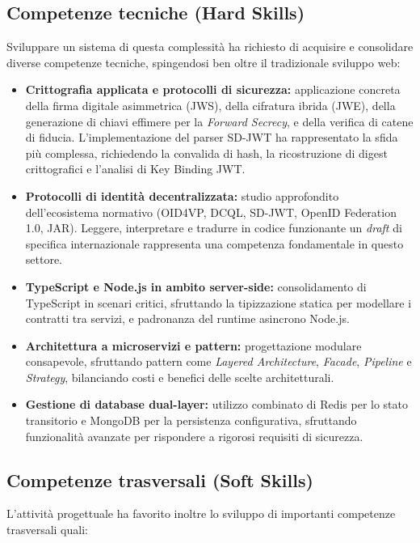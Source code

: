 \subsection{Competenze tecniche (Hard Skills)}
Sviluppare un sistema di questa complessità ha richiesto di acquisire e consolidare diverse competenze tecniche, spingendosi ben oltre il tradizionale sviluppo web:

\begin{itemize}
    \item \textbf{Crittografia applicata e protocolli di sicurezza:} applicazione concreta della firma digitale asimmetrica (JWS), della cifratura ibrida (JWE), della generazione di chiavi effimere per la \textit{Forward Secrecy}, e della verifica di catene di fiducia. L'implementazione del parser SD-JWT ha rappresentato la sfida più complessa, richiedendo la convalida di hash, la ricostruzione di digest crittografici e l'analisi di Key Binding JWT.
    \item \textbf{Protocolli di identità decentralizzata:} studio approfondito dell'ecosistema normativo (OID4VP, DCQL, SD-JWT, OpenID Federation 1.0, JAR). Leggere, interpretare e tradurre in codice funzionante un \textit{draft} di specifica internazionale rappresenta una competenza fondamentale in questo settore.
    \item \textbf{TypeScript e Node.js in ambito server-side:} consolidamento di TypeScript in scenari critici, sfruttando la tipizzazione statica per modellare i contratti tra servizi, e padronanza del runtime asincrono Node.js.
    \item \textbf{Architettura a microservizi e pattern:} progettazione modulare consapevole, sfruttando pattern come \textit{Layered Architecture}, \textit{Facade}, \textit{Pipeline} e \textit{Strategy}, bilanciando costi e benefici delle scelte architetturali.
    \item \textbf{Gestione di database dual-layer:} utilizzo combinato di Redis per lo stato transitorio e MongoDB per la persistenza configurativa, sfruttando funzionalità avanzate per rispondere a rigorosi requisiti di sicurezza.
\end{itemize}

\subsection{Competenze trasversali (Soft Skills)}
L'attività progettuale ha favorito inoltre lo sviluppo di importanti competenze trasversali quali:

